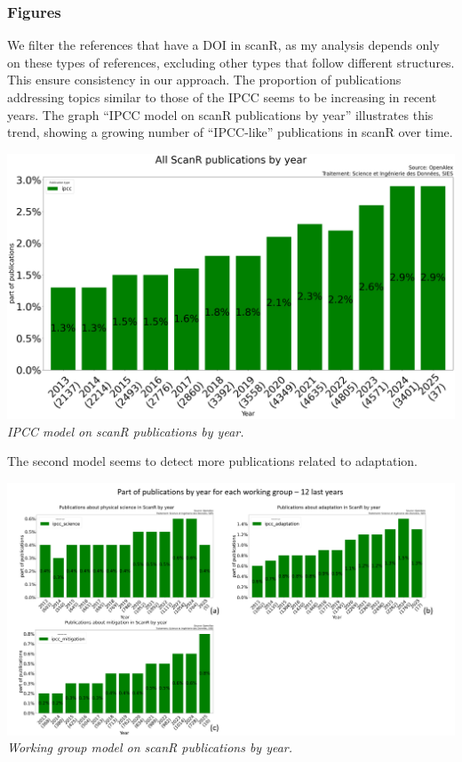 \documentclass[
]{article}
\begin{document}
\hypertarget{figures}{%
\subsubsection{Figures}\label{figures}}

We filter the references that have a DOI in scanR, as my analysis
depends only on these types of references, excluding other types that
follow different structures. This ensure consistency in our approach.
The proportion of publications addressing topics similar to those of the
IPCC seems to be increasing in recent years. The graph ``IPCC model on
scanR publications by year'' illustrates this trend, showing a growing
number of ``IPCC-like'' publications in scanR over time.

\includegraphics{./images/teds_model_scanR1.png} \emph{IPCC model on
scanR publications by year.}

The second model seems to detect more publications related to
adaptation.

\includegraphics{./images/teds_model_scanR_wg.png} \emph{Working group
model on scanR publications by year.}
\end{document}
